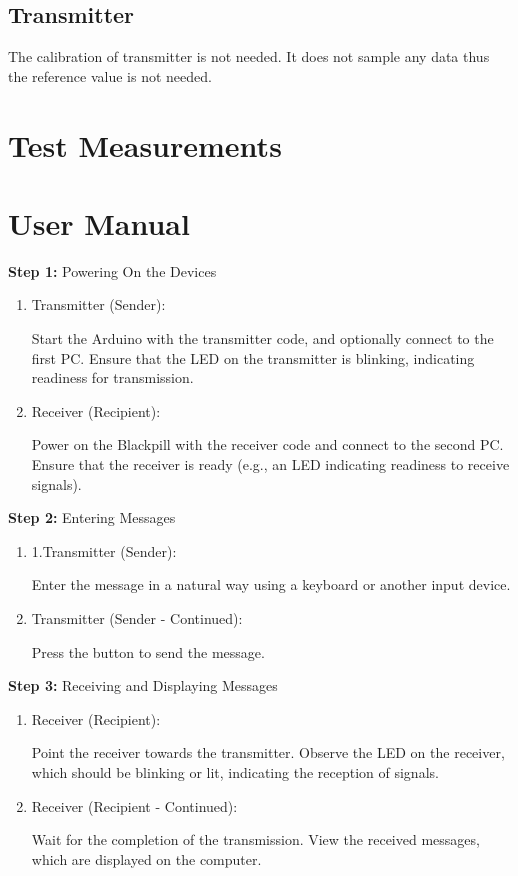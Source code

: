 \documentclass[12pt]{article}
\begin{document}
  \subsection{Transmitter}
  The calibration of transmitter is not needed. It does not sample any data thus the reference value is not needed.
	
	\section{Test Measurements}
	
	\section{User Manual}
  \textbf{Step 1:} Powering On the Devices

  \begin{enumerate}[label=\alph*).]
    \item Transmitter (Sender):

Start the Arduino with the transmitter code, and optionally connect to the first PC.
Ensure that the LED on the transmitter is blinking, indicating readiness for transmission.

\item Receiver (Recipient):

Power on the Blackpill with the receiver code and connect to the second PC.
Ensure that the receiver is ready (e.g., an LED indicating readiness to receive signals).
  \end{enumerate}


\noindent\textbf{Step 2:} Entering Messages
\begin{enumerate}
  \item 1.Transmitter (Sender):

  Enter the message in a natural way using a keyboard or another input device.

\item Transmitter (Sender - Continued):

Press the button to send the message.
\end{enumerate}


\noindent\textbf{Step 3:} Receiving and Displaying Messages
\begin{enumerate}
  \item Receiver (Recipient):

Point the receiver towards the transmitter.
Observe the LED on the receiver, which should be blinking or lit, indicating the reception of signals.

\item Receiver (Recipient - Continued):

Wait for the completion of the transmission.
View the received messages, which are displayed on the computer.

\end{enumerate}
\end{document}

